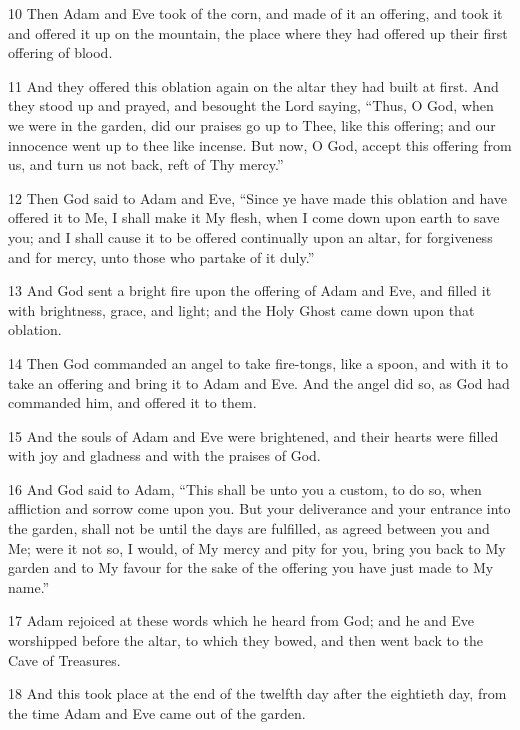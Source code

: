 \par 10 Then Adam and Eve took of the corn, and made of it an offering, and took it and offered it up on the mountain, the place where they had offered up their first offering of blood.

\par 11 And they offered this oblation again on the altar they had built at first. And they stood up and prayed, and besought the Lord saying, “Thus, O God, when we were in the garden, did our praises go up to Thee, like this offering; and our innocence went up to thee like incense. But now, O God, accept this offering from us, and turn us not back, reft of Thy mercy.”

\par 12 Then God said to Adam and Eve, “Since ye have made this oblation and have offered it to Me, I shall make it My flesh, when I come down upon earth to save you; and I shall cause it to be offered continually upon an altar, for forgiveness and for mercy, unto those who partake of it duly.”

\par 13 And God sent a bright fire upon the offering of Adam and Eve, and filled it with brightness, grace, and light; and the Holy Ghost came down upon that oblation.

\par 14 Then God commanded an angel to take fire-tongs, like a spoon, and with it to take an offering and bring it to Adam and Eve. And the angel did so, as God had commanded him, and offered it to them.

\par 15 And the souls of Adam and Eve were brightened, and their hearts were filled with joy and gladness and with the praises of God.

\par 16 And God said to Adam, “This shall be unto you a custom, to do so, when affliction and sorrow come upon you. But your deliverance and your entrance into the garden, shall not be until the days are fulfilled, as agreed between you and Me; were it not so, I would, of My mercy and pity for you, bring you back to My garden and to My favour for the sake of the offering you have just made to My name.”

\par 17 Adam rejoiced at these words which he heard from God; and he and Eve worshipped before the altar, to which they bowed, and then went back to the Cave of Treasures.

\par 18 And this took place at the end of the twelfth day after the eightieth day, from the time Adam and Eve came out of the garden.

